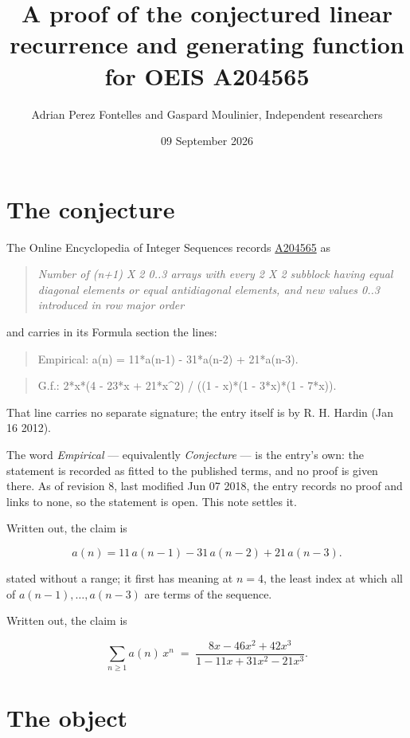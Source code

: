\documentclass[11pt]{article}
\title{A proof of the conjectured linear recurrence and generating function for OEIS A204565}
\author{Adrian Perez Fontelles and Gaspard Moulinier, Independent researchers}
\date{09 September 2026}
\theoremstyle{definition}
\begin{document}
\maketitle
\section{The conjecture}

The Online Encyclopedia of Integer Sequences records \href{https://oeis.org/A204565}{A204565} as

\begin{quote}\itshape Number of (n+1) X 2 0..3 arrays with every 2 X 2 subblock having equal diagonal elements or equal antidiagonal elements, and new values 0..3 introduced in row major order\end{quote}

and carries in its Formula section the lines:

\begin{quote}\ttfamily Empirical: a(n) = 11*a(n-1) - 31*a(n-2) + 21*a(n-3).\end{quote}

\begin{quote}\ttfamily G.f.: 2*x*(4 - 23*x + 21*x\textasciicircum{}2) / ((1 - x)*(1 - 3*x)*(1 - 7*x)).\end{quote}

That line carries no separate signature; the entry itself is by R. H. Hardin (Jan 16 2012).

The word {\itshape Empirical} --- equivalently {\itshape Conjecture} --- is the entry's own: the statement is recorded as fitted to the published terms, and no proof is given there. As of revision 8, last modified Jun 07 2018, the entry records no proof and links to none, so the statement is open. This note settles it.

Written out, the claim is

\[a(n) = 11\,a(n-1) - 31\,a(n-2) + 21\,a(n-3).\]

stated without a range; it first has meaning at $n = 4$, the least index at which all of $a(n-1),\dots,a(n-3)$ are terms of the sequence.

Written out, the claim is

\[\sum_{n \ge 1} a(n)\,x^n \;=\; \frac{8x - 46x^{2} + 42x^{3}}{1 - 11x + 31x^{2} - 21x^{3}}.\]

\section{The object}
\end{document}
